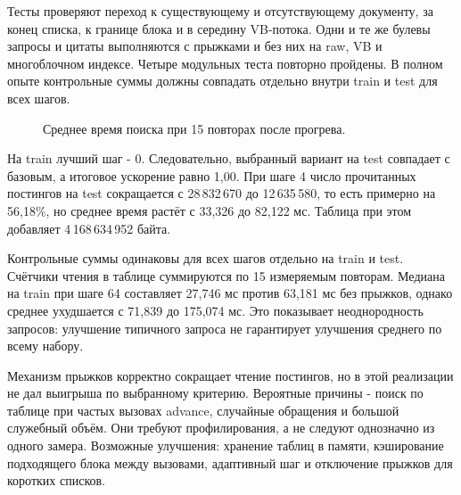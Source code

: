 \testing
Тесты проверяют переход к существующему и отсутствующему документу,
за конец списка, к границе блока и в середину VB-потока. Одни и те же
булевы запросы и цитаты выполняются с прыжками и без них на raw,
VB и многоблочном индексе. Четыре модульных теста повторно пройдены.
В полном опыте контрольные суммы должны совпадать отдельно внутри
train и test для всех шагов.

\results

\begin{figure}[H]\centering
{}
\caption{Среднее время поиска при 15 повторах после прогрева.}
\end{figure}
На train лучший шаг - 0. Следовательно, выбранный вариант на test
совпадает с базовым, а итоговое ускорение равно 1,00.
При шаге 4 число прочитанных постингов на test сокращается
с 28\,832\,670 до 12\,635\,580, то есть примерно на 56,18\%,
но среднее время растёт с 33,326 до 82,122 мс. Таблица при этом
добавляет 4\,168\,634\,952 байта.

Контрольные суммы одинаковы для всех шагов отдельно на train и test.
Счётчики чтения в таблице суммируются по 15 измеряемым повторам.
Медиана на train при шаге 64 составляет 27,746 мс против 63,181 мс
без прыжков, однако среднее ухудшается с 71,839 до 175,074 мс.
Это показывает неоднородность запросов: улучшение типичного запроса
не гарантирует улучшения среднего по всему набору.

\conclusions
Механизм прыжков корректно сокращает чтение постингов, но в этой
реализации не дал выигрыша по выбранному критерию. Вероятные причины
- поиск по таблице при частых вызовах advance, случайные обращения
и большой служебный объём. Они требуют профилирования, а не следуют
однозначно из одного замера. Возможные улучшения: хранение таблиц
в памяти, кэширование подходящего блока между вызовами,
адаптивный шаг и отключение прыжков для коротких списков.
